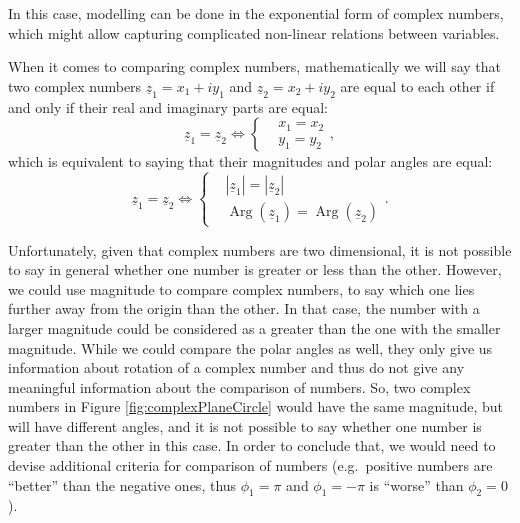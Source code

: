 \documentclass[
]{book}
\DeclareMathOperator\Arg{Arg}
\begin{document}
In this case, modelling can be done in the exponential form of complex numbers, which might allow capturing complicated non-linear relations between variables.

When it comes to comparing complex numbers, mathematically we will say that two complex numbers \(\underline{z}_1 = x_1 + i y_1\) and \(\underline{z}_2 = x_2 + i y_2\) are equal to each other if and only if their real and imaginary parts are equal:
\begin{equation*}
    \underline{z}_1 = \underline{z}_2 \iff \left \lbrace
    \begin{aligned}
        & x_1 = x_2 \\
        & y_1 = y_2
    \end{aligned}
    \right. ,
\end{equation*}
which is equivalent to saying that their magnitudes and polar angles are equal:
\begin{equation*}
    \underline{z}_1 = \underline{z}_2 \iff \left \lbrace
    \begin{aligned}
        & |\underline{z}_1| = |\underline{z}_2| \\
        & \Arg(\underline{z}_1) = \Arg(\underline{z}_2)
    \end{aligned}
    \right. .
\end{equation*}

Unfortunately, given that complex numbers are two dimensional, it is not possible to say in general whether one number is greater or less than the other. However, we could use magnitude to compare complex numbers, to say which one lies further away from the origin than the other. In that case, the number with a larger magnitude could be considered as a greater than the one with the smaller magnitude. While we could compare the polar angles as well, they only give us information about rotation of a complex number and thus do not give any meaningful information about the comparison of numbers. So, two complex numbers in Figure \ref{fig:complexPlaneCircle} would have the same magnitude, but will have different angles, and it is not possible to say whether one number is greater than the other in this case. In order to conclude that, we would need to devise additional criteria for comparison of numbers (e.g.~positive numbers are ``better'' than the negative ones, thus \(\phi_1=\pi\) and \(\phi_1=-\pi\) is ``worse'' than \(\phi_2=0\)).
\end{document}
